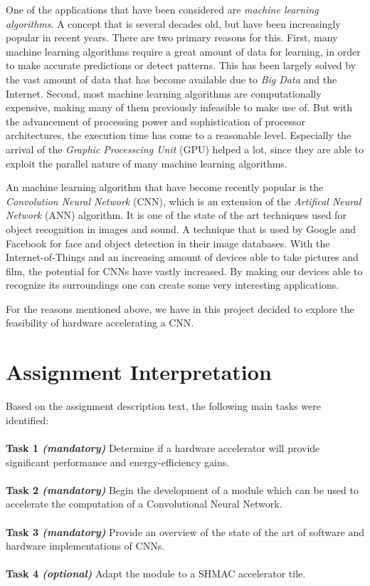 One of the applications that have been considered are \textit{machine learning algorithms}. A concept that is several decades old, but have been increasingly popular in recent years. There are two primary reasons for this. First, many machine learning algorithms require a great amount of data for learning, in order to make accurate predictions or detect patterns. This has been largely solved by the vast amount of data that has become available due to \textit{Big Data} and the Internet. Second, most machine learning algorithms are computationally expensive, making many of them previously infeasible to make use of. But with the advancement of processing power and sophistication of processor architectures, the execution time has come to a reasonable level. Especially the arrival of the \textit{Graphic Processcing Unit} (GPU) helped a lot, since they are able to exploit the parallel nature of many machine learning algorithms. 

An machine learning algorithm that have become recently popular is the \textit{Convolution Neural Network} (CNN), which is an extension of the \textit{Artifical Neural Network} (ANN) algorithm. It is one of the state of the art techniques used for object recognition in images and sound. A technique that is used by Google and Facebook for face and object detection in their image databases. With the Internet-of-Things and an increasing amount of devices able to take pictures and film, the potential for CNNs have vastly increased. By making our devices able to recognize its surroundings one can create some very interesting applications.

For the reasons mentioned above, we have in this project decided to explore the feasibility of hardware accelerating a CNN. 

\section{Assignment Interpretation}

Based on the assignment description text, the following main tasks were
identified:\\ \hfil \\ \hfil
\textbf{Task 1 \textit{(mandatory)}} Determine if a hardware accelerator will provide significant performance and energy-efficiency gains.  \\ \hfil \\ \hfil
\textbf{Task 2 \textit{(mandatory)}} Begin the development of a module which can be used to accelerate the computation of a Convolutional Neural Network.\\ \hfil \\ \hfil
\textbf{Task 3 \textit{(mandatory)}} Provide an overview of the state of the art of software and hardware implementations of CNNs. \\ \hfil \\ \hfil
\textbf{Task 4 \textit{(optional)}} Adapt the module to a SHMAC accelerator tile. \\ \hfil \\ \hfil


